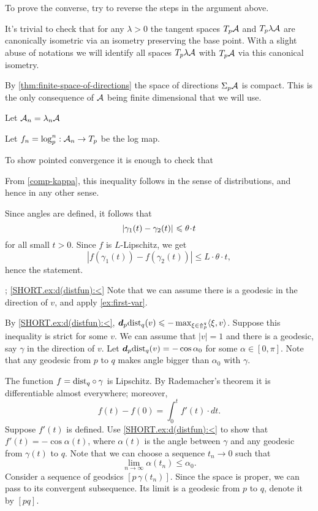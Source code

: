 To prove the converse, try to reverse the steps in the argument above.


It's trivial to check that for any $\lambda>0$ the tangent spaces $T_p\mathcal{A}$ and $ T_p\lambda \mathcal{A} $ are canonically isometric via an isometry preserving the base point. With a slight abuse of notations we will identify all spaces  $T_p\lambda \mathcal{A} $ with $T_p\mathcal{A}$ via this canonical isometry.

By \ref{thm:finite-space-of-directions} the space of directions $\Sigma_p\mathcal{A}$ is compact. This is the only consequence of $\mathcal{A}$ being finite dimensional that we will use. 

Let  $\mathcal{A}_n=\lambda_n\mathcal{A}$

Let $f_n=\log^n _p:   \mathcal{A}_n\to T_p$ be the log map.

To show pointed convergence it is enough to check that         

 From \ref{comp-kappa}, this inequality follows in the sense of distributions, and hence in any other sense.

Since angles are defined, it follows that 
\[\dist{\gamma_1(t)}{\gamma_2(t)}{}\le \theta\cdot t\]
for all small $t>0$.     
Since $f$ is $L$-Lipschitz, we get 
\[|f(\gamma_1(t))-f(\gamma_2(t))|\le L\cdot \theta\cdot t,\]
hence the statement.

\parbf{\ref{ex:d(distfun)}}; \ref{SHORT.ex:d(distfun):<}
Note that we can assume there is a geodesic in the direction of $v$, and apply \ref{ex:first-var}.

By \ref{SHORT.ex:d(distfun):<}, $\bm{d}_p\mathrm{dist}_q(v)\leqslant-\max_{\xi\in\Uparrow_p^q}\langle\xi,v\rangle$.
Suppose this inequality is strict for some $v$.
We can assume that $|v|=1$ and there is a geodesic, say $\gamma$ in the direction of $v$.
Let $\bm{d}_p\mathrm{dist}_q(v)=-\cos\alpha_0$ for some $\alpha\in [0,\pi]$.
Note that any geodesic from $p$ to $q$ makes angle bigger than $\alpha_0$ with $\gamma$.


The function $f=\mathrm{dist}_q\circ\gamma$ is Lipschitz.
By Rademacher's theorem it is differentiable almost everywhere;
moreover, 
\[f(t)-f(0)=\int_0^t f'(t)\cdot dt.\]
Suppose $f'(t)$ is defined.
Use \ref{SHORT.ex:d(distfun):<} to show that 
$f'(t)=-\cos\alpha(t)$, where $\alpha(t)$ is the angle between $\gamma$ and any geodesic from $\gamma(t)$ to $q$.
Note that we can choose a sequence $t_n\to 0$ such that 
\[\lim_{n\to\infty}\alpha(t_n) \le \alpha_0.\]
Consider a sequence of geodsics $[p\,\gamma(t_n)]$.
Since the space is proper, we can pass to its convergent subsequence.
Its limit is a geodesic from $p$ to $q$, denote it by $[pq]$.

